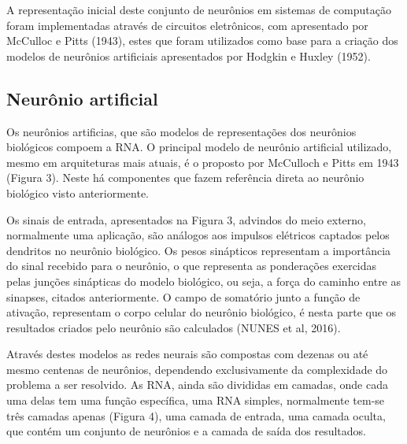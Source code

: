

A representação inicial deste conjunto de neurônios em sistemas de computação foram implementadas através de circuitos eletrônicos, com apresentado por McCulloc e Pitts (1943), estes que foram utilizados como base para a criação dos modelos de neurônios artificiais apresentados por Hodgkin e Huxley (1952).

\subsection{Neurônio artificial}

Os neurônios artificias, que são modelos de representações dos neurônios biológicos compoem a RNA. O principal modelo de neurônio artificial utilizado, mesmo em arquiteturas mais atuais, é o proposto por McCulloch e Pitts em 1943 (Figura 3). Neste há componentes que fazem referência direta ao neurônio biológico visto anteriormente.


Os sinais de entrada, apresentados na Figura 3, advindos do meio externo, normalmente uma aplicação, são análogos aos impulsos elétricos captados pelos dendritos no neurônio biológico.  Os pesos sinápticos representam a importância do sinal recebido para o neurônio, o que representa as ponderações exercidas pelas junções sinápticas do modelo biológico, ou seja, a força do caminho entre as sinapses, citados anteriormente. O campo de somatório junto a função de ativação, representam o corpo celular do neurônio biológico, é nesta parte que os resultados criados pelo neurônio são calculados (NUNES et al, 2016).

Através destes modelos as redes neurais são compostas com dezenas ou até mesmo centenas de neurônios, dependendo exclusivamente da complexidade do problema a ser resolvido. As RNA, ainda são divididas em camadas, onde cada uma delas tem uma função específica, uma RNA simples, normalmente tem-se três camadas apenas (Figura 4), uma camada de entrada, uma camada oculta, que contém um conjunto de neurônios e a camada de saída dos resultados.


